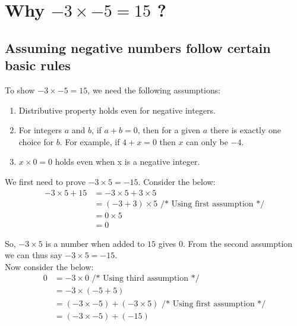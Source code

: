 \documentclass{article}
\begin{document}
\section*{Why $-3 \times -5 = 15$ ?}

\subsection{Assuming negative numbers follow certain basic rules}

To show $-3 \times -5 = 15$, we need the following assumptions:
\begin{enumerate}
\item Distributive property holds even for negative integers.
\item For integers $a$ and $b$, if $a + b = 0$, then for a given $a$ there is exactly one choice for $b$. For example, if $4 + x = 0$ then $x$ can only be $-4$.
\item $x \times 0 = 0$ holds even when x is a negative integer.
\end{enumerate}


We first need to prove $-3 \times 5 = -15$. Consider the below:
\begin{displaymath}
\begin{split}
	-3 \times 5 + 15 & = -3 \times 5 + 3 \times 5\\
	                 & = (-3 + 3) \times 5 \mbox{\ \ \ \ /*\ Using first assumption\ */}  \\
	                 & = 0 \times 5\\
	                 & = 0
\end{split}
\end{displaymath}

So, $-3 \times 5$ is a number when added to $15$ gives $0$. From the second assumption we can thus say $-3 \times 5 = -15$.\\

Now consider the below:
\begin{displaymath}
	\begin{split}
	            0 & = -3 \times 0\mbox{\ \ \ \ \ \ \ \ \ \ \ \ \ \ \ \ \ \ \ \ \ \ \ \ \ /*\ Using third assumption\ */}  \\
	            & = -3 \times (-5+5)\\
	            & = (-3 \times -5) + (-3 \times 5) \mbox{\ \ \ \ /*\ Using first assumption\ */}  \\
	            & = (-3 \times -5) + (-15)
	\end{split}
\end{displaymath}
\end{document}
